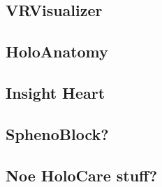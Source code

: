 \subsection*{VRVisualizer}\label{chap:vrvis}

\subsection*{HoloAnatomy}

\subsection*{Insight Heart}

\subsection*{SphenoBlock?}

\subsection*{Noe HoloCare stuff?}

